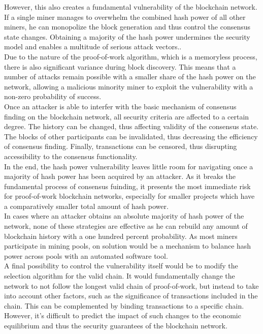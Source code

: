 \documentclass[12pt,a4paper]{article}
\begin{document}
However, this also creates a fundamental vulnerability of the blockchain network. If a single miner manages to overwhelm the combined hash power of all other miners, he can monopolize the block generation and thus control the consensus state changes. Obtaining a majority of the hash power undermines the security model and enables a multitude of serious attack vectors..\\

Due to the nature of the proof-of-work algorithm, which is a memoryless process, there is also significant variance during block discovery. This means that a number of attacks remain possible with a smaller share of the hash power on the network, allowing a malicious minority miner to exploit the vulnerability with a non-zero probability of success.\\

Once an attacker is able to interfer with the basic mechanism of consensus finding on the blockchain network, all security criteria are affected to a certain degree. The history can be changed, thus affecting validity of the consensus state. The blocks of other participants can be invalidated, thus decreasing the efficiency of consensus finding. Finally, transactions can be censored, thus disrupting accessibility to the consensus functionality.\\

In the end, the hash power vulnerability leaves little room for navigating once a majority of hash power has been acquired by an attacker. As it breaks the fundamental process of consensus fuinding, it presents the most immediate risk for proof-of-work blockchain networks, especially for smaller projects which have a comparatively smaller total amount of hash power.\\

In cases where an attacker obtains an absolute majority of hash power of the network, none of these strategies are effective as he can rebuild any amount of blockchain history with a one hundred percent probability. As most miners participate in mining pools, on solution would be a mechanism to balance hash power across pools with an automated software tool.\\

A final possibility to control the vulnerability itself would be to modify the selection algorithm for the valid chain. It would fundamentally change the network to not follow the longest valid chain of proof-of-work, but instead to take into account other factors, such as the significance of transactions included in the chain. This can be complemented by binding transactions to a specific chain. However, it's difficult to predict the impact of such changes to the economic equilibrium and thus the security guarantees of the blockchain network.\\
\end{document}
